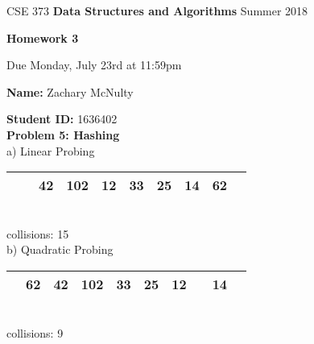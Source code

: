 \documentclass[12pt,a4paper]{article}
\begin{document}
%
%
\begin{center}
CSE 373    \hspace{0.4 cm}  
{\bf Data Structures and Algorithms }
  \hspace{0.4 cm}   Summer 2018
\end{center} 
\vspace{-7 mm}
\noindent \hrulefill
\vspace{3 mm}


%
%

\begin{center}
{\bf \Large Homework 3}

Due Monday, July 23rd at 11:59pm
\end{center}


{\bf Name:} Zachary McNulty

{\bf Student ID:} 1636402\\

%
%

{\bf\large Problem 5: Hashing}\\

a) Linear Probing\\

\begin{tabular}{|c|c|c|c|c|c|c|c|c|c|}
\hline
& & 42 & 102 & 12 & 33 & 25 & 14 & 62 & \\
\hline
\end{tabular}\\
collisions: 15 \\

b) Quadratic Probing\\

\begin{tabular}{|c|c|c|c|c|c|c|c|c|c|}
\hline
& 62& 42 & 102 & 33 & 25 & 12 & & 14 & \\
\hline
\end{tabular} \\
collisions: 9\\
\end{document}
